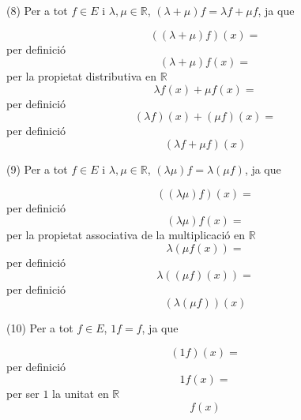 \begin{solucio}
(8) Per a tot $f\in E$ i $\lambda ,\mu \in \mathbb{R}$, $\left( \lambda +\mu
\right) f=\lambda f+\mu f$, ja que

\begin{equation*}
\left( \left( \lambda +\mu \right) f\right) (x)=
\end{equation*}%
per definició%
\begin{equation*}
\left( \lambda +\mu \right) f(x)=
\end{equation*}%
per la propietat distributiva en $\mathbb{R}$
\begin{equation*}
\lambda f(x)+\mu f(x)=
\end{equation*}%
per definició
\begin{equation*}
\left( \lambda f\right) (x)+\left( \mu f\right) (x)=
\end{equation*}%
per definició
\begin{equation*}
\left( \lambda f+\mu f\right) (x)
\end{equation*}

(9) Per a tot $f\in E$ i $\lambda ,\mu \in \mathbb{R}$, $\left( \lambda \mu
\right) f=\lambda \left( \mu f\right) $, ja que

\begin{equation*}
\left( \left( \lambda \mu \right) f\right) (x)=
\end{equation*}%
per definició%
\begin{equation*}
\left( \lambda \mu \right) f(x)=
\end{equation*}%
per la propietat associativa de la multiplicació en $\mathbb{R}$%
\begin{equation*}
\lambda \left( \mu f(x)\right) =
\end{equation*}%
per definició%
\begin{equation*}
\lambda \left( \left( \mu f\right) (x)\right) =
\end{equation*}%
per definició%
\begin{equation*}
\left( \lambda \left( \mu f\right) \right) (x)
\end{equation*}

(10) Per a tot $f\in E$, $1f=f$, ja que

\begin{equation*}
\left( 1f\right) (x)=
\end{equation*}%
per definició%
\begin{equation*}
1f(x)=
\end{equation*}%
per ser $1$ la unitat en $\mathbb{R}$%
\begin{equation*}
f(x)
\end{equation*}
\end{solucio}

